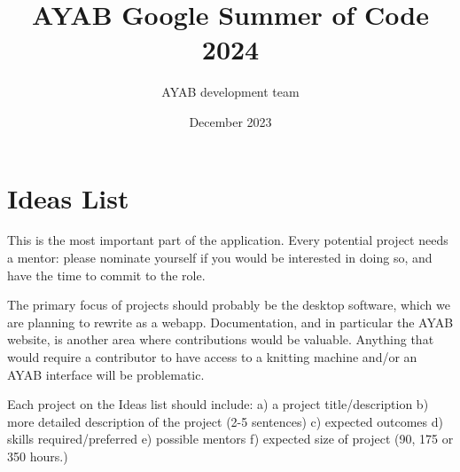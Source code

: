 \documentclass{article}
\title{AYAB Google Summer of Code 2024}
\author{AYAB development team}
\date{December 2023}
\begin{document}
\maketitle

\section{Ideas List}

This is the most important part of the application. Every potential project needs a mentor: please nominate yourself if you would be interested in doing so, and have the time to commit to the role.

The primary focus of projects should probably be the desktop software, which we are planning to rewrite as a webapp. Documentation, and in particular the AYAB website, is another area where contributions would be valuable. Anything that would require a contributor to have access to a knitting machine and/or an AYAB interface will be problematic.

Each project on the Ideas list should include: a) a project title/description b) more detailed description of the project (2-5 sentences) c) expected outcomes d) skills required/preferred e) possible mentors f) expected size of project (90, 175 or 350 hours.)
\end{document}
